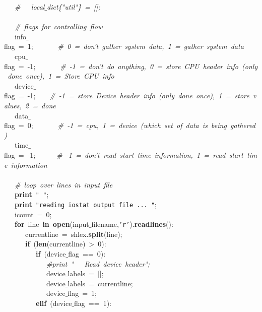 \mbox{}\ \ \ \textit{\#\ \ \ local$\_$dict\{"{}util"{}\}\ =\ [];} \\
\mbox{}\ \ \  \\
\mbox{}\ \ \ \textit{\#\ flags\ for\ controlling\ flow} \\
\mbox{}\ \ \ info$\_$flag\ =\ 1;\ \ \ \ \ \ \ \textit{\#\ 0\ =\ don't\ gather\ system\ data,\ 1\ =\ gather\ system\ data} \\
\mbox{}\ \ \ cpu$\_$flag\ =\ -1;\ \ \ \ \ \ \ \textit{\#\ -1\ =\ don't\ do\ anything,\ 0\ =\ store\ CPU\ header\ info\ (only\ done\ once),\ 1\ =\ Store\ CPU\ info} \\
\mbox{}\ \ \ device$\_$flag\ =\ -1;\ \ \ \ \textit{\#\ -1\ =\ store\ Device\ header\ info\ (only\ done\ once),\ 1\ =\ store\ values,\ 2\ =\ done} \\
\mbox{}\ \ \ data$\_$flag\ =\ 0;\ \ \ \ \ \ \ \textit{\#\ -1\ =\ cpu,\ 1\ =\ device\ (which\ set\ of\ data\ is\ being\ gathered)} \\
\mbox{}\ \ \ time$\_$flag\ =\ -1;\ \ \ \ \ \ \textit{\#\ -1\ =\ don't\ read\ start\ time\ information,\ 1\ =\ read\ start\ time\ information} \\
\mbox{}\ \ \  \\
\mbox{}\ \ \ \textit{\#\ loop\ over\ lines\ in\ input\ file} \\
\mbox{}\ \ \ \textbf{print}\ \texttt{"{}\ "{}}; \\
\mbox{}\ \ \ \textbf{print}\ \texttt{"{}reading\ iostat\ output\ file\ ...\ "{}}; \\
\mbox{}\ \ \ icount\ =\ 0; \\
\mbox{}\ \ \ \textbf{for}\ line\ \textbf{in}\ \textbf{open}(input$\_$filename,\texttt{'r'}).\textbf{readlines}(): \\
\mbox{}\ \ \ \ \ \ currentline\ =\ shlex.\textbf{split}(line); \\
\mbox{}\ \ \ \ \ \ \textbf{if}\ (\textbf{len}(currentline)\ \textgreater{}\ 0):\ \ \ \ \ \ \ \ \  \\
\mbox{}\ \ \ \ \ \ \ \ \ \textbf{if}\ (device$\_$flag\ ==\ 0): \\
\mbox{}\ \ \ \ \ \ \ \ \ \ \ \ \textit{\#print\ "{}\ \ \ Read\ device\ header"{};} \\
\mbox{}\ \ \ \ \ \ \ \ \ \ \ \ device$\_$labels\ =\ [];\ \ \ \ \ \ \ \ \ \ \ \  \\
\mbox{}\ \ \ \ \ \ \ \ \ \ \ \ device$\_$labels\ =\ currentline; \\
\mbox{}\ \ \ \ \ \ \ \ \ \ \ \ device$\_$flag\ =\ 1; \\
\mbox{}\ \ \ \ \ \ \ \ \ \textbf{elif}\ (device$\_$flag\ ==\ 1): \\
